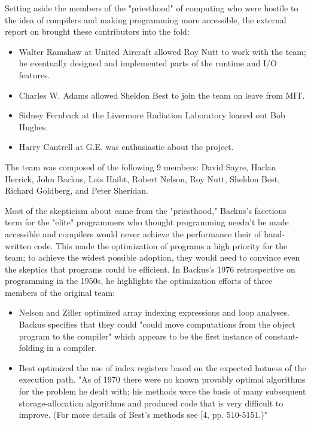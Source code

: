 Setting aside the members of the "priesthood" of computing who were hostile to
the idea of compilers and making programming more accessible, the external
report on \FTN{} brought these contributors into the fold:
\begin{itemize}
  \item Walter Ramshaw at United Aircraft allowed Roy Nutt to work
    with the team; he
    eventually designed and implemented parts of the runtime and I/O features.
  \item Charles W. Adams allowed Sheldon Best to join the team on
    leave from MIT.
  \item Sidney Fernback at the Livermore Radiation Laboratory loaned
    out Bob Hughes.
  \item Harry Cantrell at G.E. was enthusiastic about the project.
\end{itemize}

The team was composed of the following 9 members: David Sayre, Harlan Herrick,
John Backus, Lois Haibt, Robert Nelson, Roy Nutt, Sheldon Best, Richard
Goldberg, and Peter Sheridan.

Most of the skepticism about \FTN{} came from the "priesthood," Backus's
facetious term for the "elite" programmers who thought programming needn't be
made accessible and compilers would never achieve the performance their of
hand-written code. This made the optimization of \FTN{} programs a high
priority for the team; to achieve the widest possible adoption, they would need
to convince even the skeptics that \FTN{} programs could be efficient. In
Backus's 1976 retrospective on programming in the
1950s\cite{Backus_1980_Programming_in_America_in_1950s}, he highlights the
optimization efforts of three members of the original team:

\begin{itemize}
  \item Nelson and Ziller optimized array indexing expressions and
    loop analyses.
    Backus specifies that they could "could move computations from the object
    program to the compiler" which appears to be the first instance of
    constant-folding in a compiler.
  \item Best optimized the use of index registers based on the
    expected hotness of the
    execution path. "As of 1970 there were no known provably optimal
    algorithms for
    the problem he dealt with; his methods were the basis of many subsequent
    storage-allocation algorithms and produced code that is very difficult to
    improve. (For more details of Best's methods see [4, pp. 510-5151.)"
  \end{itemize}

